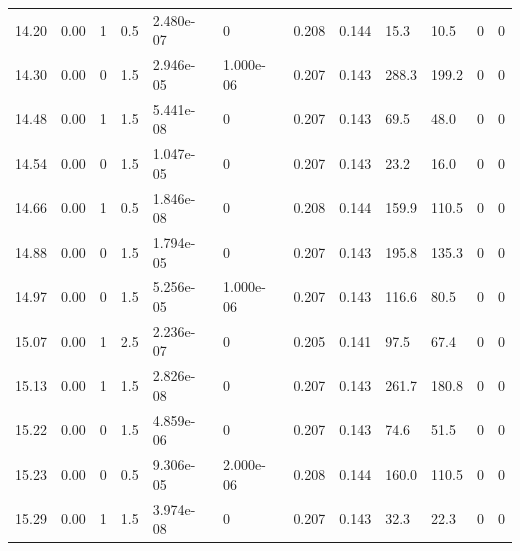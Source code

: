 \documentclass[preview]{standalone}
\begin{document}
{{{{\begin{tabular}{L{1.2cm}C{1.2cm} C{0.3cm}C{0.5cm} C{1.4cm}C{1.4cm} C{1.4cm}C{1.4cm} C{1.6cm}C{1.6cm} C{1.6cm}C{1.6cm}}
  14.20  &  0.00  & 1     & 0.5 &  2.480e-07  & 0  &  0.208&   0.144& 15.3 & 10.5   &  0 & 0  \\ 
  14.30  &  0.00  & 0     & 1.5 &  2.946e-05  & 1.000e-06  &  0.207&   0.143& 288.3 & 199.2   &  0 & 0  \\ 
  14.48  &  0.00  & 1     & 1.5 &  5.441e-08  & 0  &  0.207&   0.143& 69.5 & 48.0   &  0 & 0  \\ 
  14.54  &  0.00  & 0     & 1.5 &  1.047e-05  & 0  &  0.207&   0.143& 23.2 & 16.0   &  0 & 0  \\ 
  14.66  &  0.00  & 1     & 0.5 &  1.846e-08  & 0  &  0.208&   0.144& 159.9 & 110.5   &  0 & 0  \\ 
  14.88  &  0.00  & 0     & 1.5 &  1.794e-05  & 0  &  0.207&   0.143& 195.8 & 135.3   &  0 & 0  \\ 
  14.97  &  0.00  & 0     & 1.5 &  5.256e-05  & 1.000e-06  &  0.207&   0.143& 116.6 & 80.5   &  0 & 0  \\ 
  15.07  &  0.00  & 1     & 2.5 &  2.236e-07  & 0  &  0.205&   0.141& 97.5 & 67.4   &  0 & 0  \\ 
  15.13  &  0.00  & 1     & 1.5 &  2.826e-08  & 0  &  0.207&   0.143& 261.7 & 180.8   &  0 & 0  \\ 
  15.22  &  0.00  & 0     & 1.5 &  4.859e-06  & 0  &  0.207&   0.143& 74.6 & 51.5   &  0 & 0  \\ 
  15.23  &  0.00  & 0     & 0.5 &  9.306e-05  & 2.000e-06  &  0.208&   0.144& 160.0 & 110.5   &  0 & 0  \\ 
  15.29  &  0.00  & 1     & 1.5 &  3.974e-08  & 0  &  0.207&   0.143& 32.3 & 22.3   &  0 & 0  \\ 
\hline 
\end{tabular} 

}}}}
\end{document}
